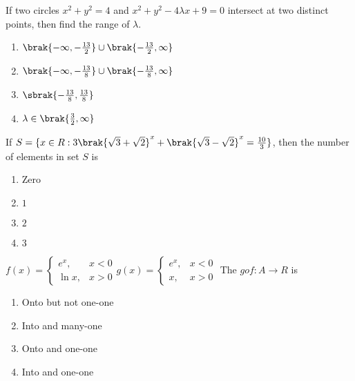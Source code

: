 \item If two circles $x^2 + y^2 = 4$ and $x^2 + y^2 - 4\lambda x + 9 = 0$ intersect at two distinct points, then find the range of $\lambda$.  \hfill {}
\begin{multicols}{2}
\begin{enumerate}
    \item $\brak{ -\infty, -\frac{13}{2}} \cup \brak{ -\frac{13}{2}, \infty}$
    \item $\brak{ -\infty, -\frac{13}{8}} \cup \brak{ -\frac{13}{8}, \infty}$
    \item $\sbrak{-\frac{13}{8},\frac{13}{8}}$
    \item $\lambda \in \brak{\frac{3}{2},\infty}$
\end{enumerate}
\end{multicols}

\item If $S = \{x \in R : 3\brak{\sqrt{3} + \sqrt{2}}^x + \brak{\sqrt{3} - \sqrt{2}}^x = \frac{10}{3} \}$, then the number of elements in set $S$ is  \hfill {}

\begin{multicols}{4}
\begin{enumerate}
    \item Zero
    \item $1$
    \item $2$
    \item $3$
\end{enumerate}
\end{multicols}




\item $f(x) = \begin{cases} 
e^x, & x < 0 \\
\ln x, & x > 0 
\end{cases} g(x) = \begin{cases} 
e^x, & x < 0 \\
x, & x > 0 
\end{cases}$ The $gof: A \to R$ is   \hfill {}

\begin{multicols}{2}
\begin{enumerate}
    \item Onto but not one-one
    \item Into and many-one
    \item Onto and one-one
    \item Into and one-one
\end{enumerate}
\end{multicols}



